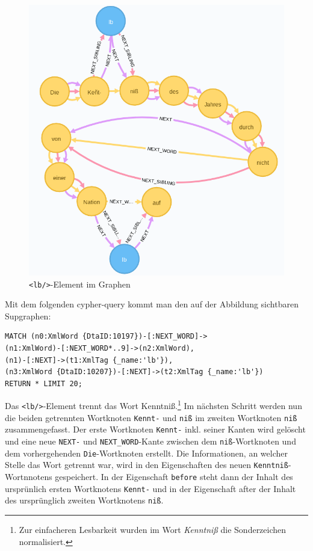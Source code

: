 \begin{figure}
\centering
\includegraphics{Bilder/TEI2Graph/lb mit Worttrennung im Graphen.png}
\caption{\texttt{\textless{}lb/\textgreater{}}-Element im Graphen}
\end{figure}

Mit dem folgenden cypher-query kommt man den auf der Abbildung
sichtbaren Supgraphen:

\begin{verbatim}
MATCH (n0:XmlWord {DtaID:10197})-[:NEXT_WORD]->
(n1:XmlWord)-[:NEXT_WORD*..9]->(n2:XmlWord),
(n1)-[:NEXT]->(t1:XmlTag {_name:'lb'}),
(n3:XmlWord {DtaID:10207})-[:NEXT]->(t2:XmlTag {_name:'lb'})
RETURN * LIMIT 20;
\end{verbatim}

Das \texttt{\textless{}lb/\textgreater{}}-Element trennt das Wort
Kenntniß.\footnote{Zur einfacheren Lesbarkeit wurden im Wort
  \emph{Kenntniß} die Sonderzeichen normalisiert.} Im nächsten Schritt
werden nun die beiden getrennten Wortknoten \texttt{Kennt-} und
\texttt{niß} im zweiten Wortknoten \texttt{niß} zusammengefasst. Der
erste Wortknoten \texttt{Kennt-} inkl. seiner Kanten wird gelöscht und
eine neue \texttt{NEXT-} und \texttt{NEXT\_WORD}-Kante zwischen dem
\texttt{niß}-Wortknoten und dem vorhergehenden \texttt{Die}-Wortknoten
erstellt. Die Informationen, an welcher Stelle das Wort getrennt war,
wird in den Eigenschaften des neuen \texttt{Kenntniß}-Wortnnotens
gespeichert. In der Eigenschaft \texttt{before} steht dann der Inhalt
des ursprünlich ersten Wortknotens \texttt{Kennt-} und in der
Eigenschaft after der Inhalt des ursprünglich zweiten Wortknotens
\texttt{niß}.

